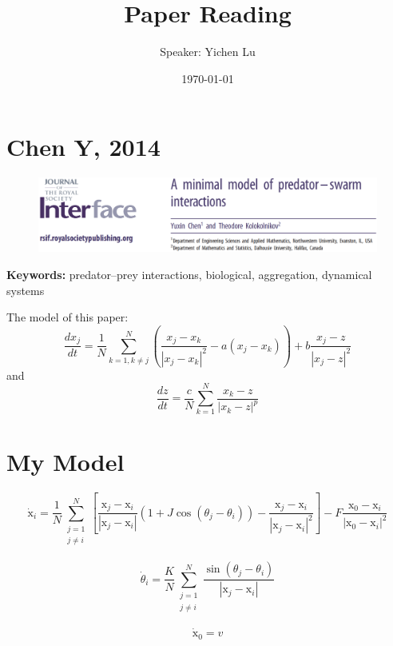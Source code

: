 \documentclass[10pt,aspectratio=43,mathserif,table]{beamer}
\title{Paper Reading}
\author{Speaker: Yichen Lu\quad \newline  \newline \quad }
\institute{\fontsize{8pt}{14pt}}
\date{\today}
\begin{document}
\section{Chen Y, 2014}

\begin{frame}
	\begin{figure}
		\centering
		\includegraphics[width=\textwidth]{ChenY2014Face.jpg}
	\end{figure}
	
	\textbf{Keywords:}  predator–prey interactions, biological, aggregation, dynamical systems
\end{frame}

\begin{frame}
    The model of this paper:
	$$
	\frac{dx_j}{dt}=\frac{1}{N}\sum_{k=1,k\ne j}^N{\left( \frac{x_j-x_k}{\left| x_j-x_k \right|^2}-a\left( x_j-x_k \right) \right) +b\frac{x_j-z}{\left| x_j-z \right|^2}}
	$$
	and
	$$
	\frac{dz}{dt}=\frac{c}{N}\sum_{k=1}^N{\frac{x_k-z}{\left| x_k-z \right|^p}}
	$$
\end{frame}

\section{My Model}

\begin{frame}
    $$
    \dot{\mathrm{x}}_i=\frac{1}{N}\sum_{\begin{array}{c}
        j=1\\
        j\ne i\\
    \end{array}}^N{\left[ \frac{\mathrm{x}_j-\mathrm{x}_i}{\left| \mathrm{x}_j-\mathrm{x}_i \right|}\left( 1+J\cos \left( \theta _j-\theta _i \right) \right) -\frac{\mathrm{x}_j-\mathrm{x}_i}{\left| \mathrm{x}_j-\mathrm{x}_i \right|^2} \right]}-F\frac{\mathrm{x}_0-\mathrm{x}_i}{\left| \mathrm{x}_0-\mathrm{x}_i \right|^2}
    $$

    $$
    \dot{\theta}_i=\frac{K}{N}\sum_{\begin{array}{c}
        j=1\\
        j\ne i\\
    \end{array}}^N{\frac{\sin \left( \theta _j-\theta _i \right)}{\left| \mathrm{x}_j-\mathrm{x}_i \right|}}
    $$

	$$
	\dot{\mathrm{x}}_0=v
	$$


\end{frame}




\end{document}
